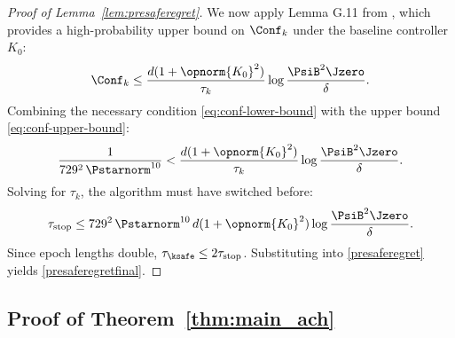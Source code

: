 \documentclass[11pt,journal,onecolumn]{IEEEtran}
\begin{document}
\begin{proof}[Proof of Lemma~\ref{lem:presaferegret}]
    We now apply Lemma G.11 from \cite{simchowitz20a}, which provides a high-probability upper bound on $\Conf_k$ under the baseline controller $K_0$:
    \begin{equation}
        \label{eq:conf-upper-bound}
        \Conf_k \le \frac{d(1 + \opnorm{K_0}^2)}{\tau_k} \log\frac{\PsiB^2 \Jzero}{\delta}.
    \end{equation}
    Combining the necessary condition \eqref{eq:conf-lower-bound} with the upper bound \eqref{eq:conf-upper-bound}:
    \[
        \frac{1}{729^2\,\Pstarnorm^{10}} < \frac{d(1 + \opnorm{K_0}^2)}{\tau_k} \log\frac{\PsiB^2 \Jzero}{\delta}.
    \]
    Solving for $\tau_k$, the algorithm must have switched before:
    \[
        \tau_{\mathrm{stop}} \le 729^2\,\Pstarnorm^{10}\, d(1 + \opnorm{K_0}^2) \log\frac{\PsiB^2 \Jzero}{\delta}.
    \]
    Since epoch lengths double, $\tau_{\ksafe} \le 2\tau_{\mathrm{stop}}$. Substituting into \eqref{presaferegret} yields \eqref{presaferegretfinal}.
\end{proof}

\subsection{Proof of Theorem~\ref{thm:main_ach}}
\end{document}
